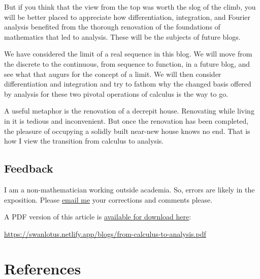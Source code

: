 \documentclass[
  a4paper,
]{article}
\begin{document}
But if you think that the view from the top was worth the slog of the
climb, you will be better placed to appreciate how differentiation,
integration, and Fourier analysis benefited from the thorough renovation
of the foundations of mathematics that led to analysis. These will be
the subjects of future blogs.

We have considered the limit of a real sequence in this blog. We will
move from the discrete to the continuous, from sequence to function, in
a future blog, and see what that augurs for the concept of a limit. We
will then consider differentiation and integration and try to fathom why
the changed basis offered by analysis for these two pivotal operations
of calculus is the way to go.

A useful metaphor is the renovation of a decrepit house. Renovating
while living in it is tedious and inconvenient. But once the renovation
has been completed, the pleasure of occupying a solidly built near-new
house knows no end. That is how I view the transition from calculus to
analysis.

\subsection{Feedback}\label{feedback}

I am a non-mathematician working outside academia. So, errors are likely
in the exposition. Please
\href{mailto:feedback.swanlotus@gmail.com}{email me} your corrections
and comments please.

\noindent A PDF version of this article is
\href{./from-calculus-to-analysis.pdf}{available for download here}:

\begin{small}

\begin{sffamily}

\url{https://swanlotus.netlify.app/blogs/from-calculus-to-analysis.pdf}

\end{sffamily}

\end{small}

\section*{References}\label{bibliography}
\end{document}
